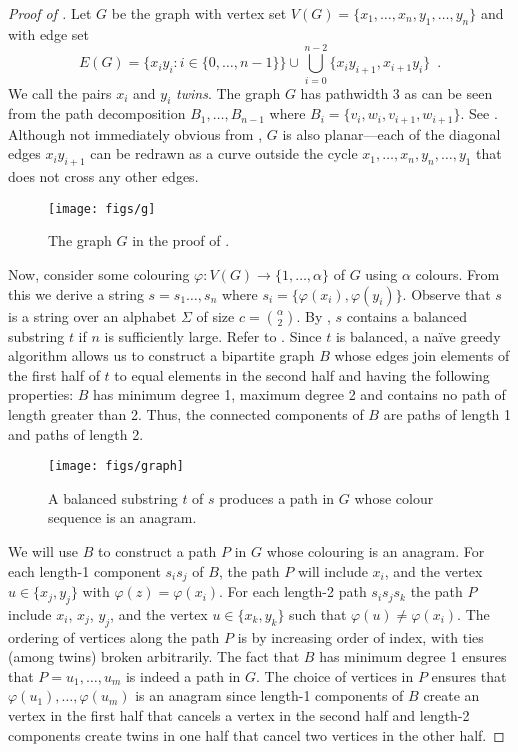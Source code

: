 \documentclass{patmorin}
\begin{document}
\begin{proof}[Proof of ]
Let $G$ be the graph with vertex set
$V(G)=\{x_1,\ldots,x_{n},y_1,\ldots,y_{n}\}$ and with edge set
\[
  E(G) = \{x_iy_i : i\in\{0,\ldots,n-1\}\} \cup \bigcup_{i=0}^{n-2} \{x_iy_{i+1},x_{i+1}y_i\} \enspace .
\]
We call the pairs $x_i$ and $y_i$ \emph{twins}.
The graph $G$ has pathwidth 3 as can be seen from the path decomposition $B_1,\ldots,B_{n-1}$ where $B_i=\{v_i,w_i,v_{i+1},w_{i+1}\}$.
See . Although not immediately obvious from , $G$ is also planar---each of the diagonal edges $x_iy_{i+1}$ can be redrawn as a curve outside the cycle $x_1,\ldots,x_n,y_n,\ldots,y_1$ that does not cross any other edges.

\begin{figure}
  \begin{center}
    \texttt{[image: figs/g]}
  \end{center}
  \caption{The graph $G$ in the proof of .}
\end{figure}

Now, consider some colouring $\varphi:V(G)\to\{1,\ldots,\alpha\}$ of $G$
using $\alpha$ colours. From this we derive a string $s=s_1\ldots,s_{n}$
where $s_i=\{\varphi(x_i),\varphi(y_i)\}$.  Observe that $s$ is
a string over an alphabet $\Sigma$ of size $c=\binom{\alpha}{2}$.
By , $s$ contains a balanced substring $t$ if $n$
is sufficiently large.  Refer to . Since $t$
is balanced, a na\"ive greedy algorithm allows us to construct a bipartite
 graph $B$ whose edges join
elements of the first half of $t$ to equal elements in the second half
and having the following properties: $B$ has minimum degree 1, maximum
degree 2 and contains no path of length greater than 2.  Thus, the
connected components of $B$ are paths of length 1 and paths of length 2.

\begin{figure}
  \begin{center}
    \texttt{[image: figs/graph]}
  \end{center}
  \caption{A balanced substring $t$ of $s$ produces a path in $G$ whose
    colour sequence is an anagram.}
\end{figure}


We will use $B$ to construct a path $P$ in $G$ whose colouring is an
anagram.  For each length-1 component $s_is_j$ of $B$, the path $P$
will include $x_i$, and the vertex $u\in\{x_j,y_j\}$ with $\varphi(z)=\varphi(x_i)$. For each length-2 path
$s_is_js_k$ the path $P$ include $x_i$, $x_j$, $y_j$, and the 
vertex $u\in\{x_k,y_k\}$ such that $\varphi(u)\neq \varphi(x_i)$.
The ordering of vertices along the path $P$ is by increasing order
of index, with ties (among twins) broken arbitrarily.
The fact that $B$ has minimum degree 1 ensures that $P=u_1,\ldots,u_m$
is indeed a path in $G$.  The choice of vertices in $P$ ensures that
$\varphi(u_1),\ldots,\varphi(u_m)$ is an anagram since length-1 components
of $B$ create an vertex in the first half that cancels a vertex in the second
half and length-2 components create twins in one half that cancel two
vertices in the other half.
\end{proof}
\end{document}
